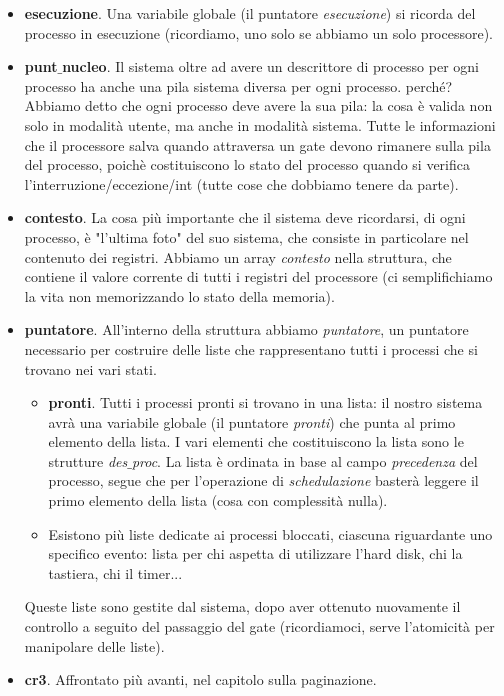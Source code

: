 \begin{itemize}
	\item \textbf{esecuzione}. Una variabile globale (il puntatore \emph{esecuzione}) si ricorda del processo in esecuzione (ricordiamo, uno solo se abbiamo un solo processore).
	\item \textbf{punt$\_$nucleo}. Il sistema oltre ad avere un descrittore di processo per ogni processo ha anche una pila sistema diversa per ogni processo. perché? Abbiamo detto che ogni processo deve avere la sua pila: la cosa è valida non solo in modalità utente, ma anche in modalità sistema. Tutte le informazioni che il processore salva quando attraversa un gate devono rimanere sulla pila del processo, poichè costituiscono lo stato del processo quando si verifica l'interruzione/eccezione/int (tutte cose che dobbiamo tenere da parte).
	\item \textbf{contesto}. La cosa più importante che il sistema deve ricordarsi, di ogni processo, è "l'ultima foto" del suo sistema, che consiste in particolare nel contenuto dei registri. Abbiamo un array \emph{contesto} nella struttura, che contiene il valore corrente di tutti i registri del processore (ci semplifichiamo la vita non memorizzando lo stato della memoria).
	\item \textbf{puntatore}. All'interno della struttura abbiamo \emph{puntatore}, un puntatore necessario per costruire delle liste che rappresentano tutti i processi che si trovano nei vari stati. 
	\begin{itemize}
		\item \textbf{pronti}. Tutti i processi pronti si trovano in una lista: il nostro sistema avrà una variabile globale (il puntatore \emph{pronti}) che punta al primo elemento della lista. I vari elementi che costituiscono la lista sono le strutture \emph{des$\_$proc}. La lista è ordinata in base al campo \emph{precedenza} del processo, segue che per l'operazione di \emph{schedulazione} basterà leggere il primo elemento della lista (cosa con complessità nulla).
		\item Esistono più liste dedicate ai processi bloccati, ciascuna riguardante uno specifico evento: lista per chi aspetta di utilizzare l'hard disk, chi la tastiera, chi il timer...
	\end{itemize}
	Queste liste sono gestite dal sistema, dopo aver ottenuto nuovamente il controllo a seguito del passaggio del gate (ricordiamoci, serve l'atomicità per manipolare delle liste).
	\item \textbf{cr3}. Affrontato più avanti, nel capitolo sulla paginazione.
\end{itemize}
